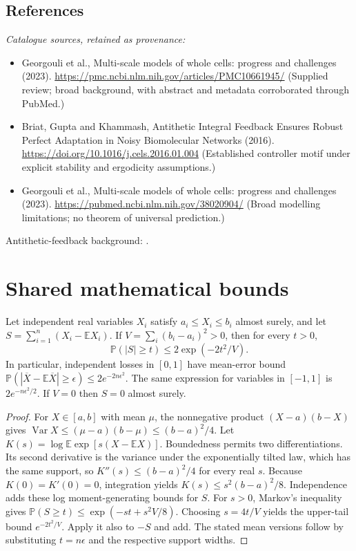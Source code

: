 \documentclass[11pt]{article}
\begin{document}
\subsection{References}
\noindent\emph{Catalogue sources, retained as provenance:}
\begin{itemize}
\item Georgouli et al., Multi-scale models of whole cells: progress and challenges (2023). \url{https://pmc.ncbi.nlm.nih.gov/articles/PMC10661945/} (Supplied review; broad background, with abstract and metadata corroborated through PubMed.)
\item Briat, Gupta and Khammash, Antithetic Integral Feedback Ensures Robust Perfect Adaptation in Noisy Biomolecular Networks (2016). \url{https://doi.org/10.1016/j.cels.2016.01.004} (Established controller motif under explicit stability and ergodicity assumptions.)
\item Georgouli et al., Multi-scale models of whole cells: progress and challenges (2023). \url{https://pubmed.ncbi.nlm.nih.gov/38020904/} (Broad modelling limitations; no theorem of universal prediction.)
\end{itemize}
\noindent Antithetic-feedback background: \cite{briat}.




\section{Shared mathematical bounds}\label{app:bounds}
\begin{lemma}\label{lem:bounded}
Let independent real variables $X_i$ satisfy $a_i\leq X_i\leq b_i$ almost surely,
and let $S=\sum_{i=1}^n(X_i-\mathbb{E} X_i)$. If
$V=\sum_i(b_i-a_i)^2>0$, then for every $t>0$,
\[
 \mathbb{P}(|S|\geq t)\leq 2\exp(-2t^2/V).
\]
In particular, independent losses in $[0,1]$ have mean-error bound
$\mathbb{P}(|\overline X-\mathbb{E}\overline X|\geq\epsilon)
\leq2e^{-2n\epsilon^2}$. The same expression for variables in $[-1,1]$
is $2e^{-n\epsilon^2/2}$. If $V=0$ then $S=0$ almost surely.
\end{lemma}
\begin{proof}
For $X\in[a,b]$ with mean $\mu$, the nonnegative product
$(X-a)(b-X)$ gives
$\operatorname{Var} X\leq(\mu-a)(b-\mu)\leq(b-a)^2/4$.
Let $K(s)=\log\mathbb{E}\exp[s(X-\mathbb{E} X)]$.
Boundedness permits two differentiations. Its second derivative is the variance
under the exponentially tilted law, which has the same support, so
$K''(s)\leq(b-a)^2/4$ for every real $s$.
Because $K(0)=K'(0)=0$, integration yields
$K(s)\leq s^2(b-a)^2/8$.
Independence adds these log moment-generating bounds for $S$.
For $s>0$, Markov's inequality gives
$\mathbb{P}(S\geq t)\leq\exp(-st+s^2V/8)$.
Choosing $s=4t/V$ yields the upper-tail bound $e^{-2t^2/V}$.
Apply it also to $-S$ and add. The stated mean versions follow by substituting
$t=n\epsilon$ and the respective support widths.
\end{proof}
\end{document}
